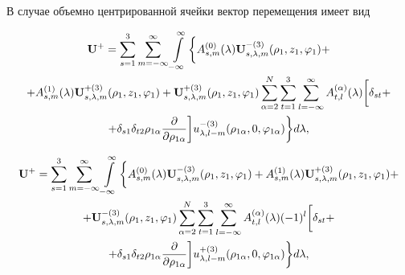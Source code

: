 В случае объемно центрированной ячейки вектор перемещения имеет вид

\begin{multline}
{{\bf{U}}^ + } = \sum\limits_{s = 1}^3 {\sum\limits_{m =  - \infty }^\infty  {\int\limits_{ - \infty }^\infty  \bigg\{  } } A_{s,m}^{(0)}(\lambda ){\bf{U}}_{s,\lambda ,m}^{ - (3)}({\rho _1},{z_1},{\varphi _1}) + \\
+ A_{s,m}^{(1)}(\lambda ){\bf{U}}_{s,\lambda ,m}^{ + (3)}({\rho _1},{z_1},{\varphi _1}) + {\bf{U}}_{s,\lambda ,m}^{ + (3)}({\rho _1},{z_1},{\varphi _1})\sum\limits_{\alpha  = 2}^N {\sum\limits_{t = 1}^3 {\sum\limits_{l =  - \infty }^\infty  {A_{t,l}^{(\alpha )}} } } (\lambda )\bigg[{\delta _{st}} + \\
+ {\delta _{s1}}{\delta _{t2}}{\rho _{1\alpha }}\frac{\partial }{{\partial {\rho _{1\alpha }}}}\bigg]u_{\lambda ,l - m}^{ - (3)}({\rho _{1\alpha }},0,{\varphi _{1\alpha }})\bigg\} d\lambda,
\label{eq:7:30}
\end{multline}

\begin{multline}
{{\bf{U}}^ + } = \sum\limits_{s = 1}^3 {\sum\limits_{m =  - \infty }^\infty  {\int\limits_{ - \infty }^\infty  \bigg\{  } } A_{s,m}^{(0)}(\lambda ){\bf{U}}_{s,\lambda ,m}^{ - (3)}({\rho _1},{z_1},{\varphi _1}) + A_{s,m}^{(1)}(\lambda ){\bf{U}}_{s,\lambda ,m}^{ + (3)}({\rho _1},{z_1},{\varphi _1}) + \\
+ {\bf{U}}_{s,\lambda ,m}^{ - (3)}({\rho _1},{z_1},{\varphi _1})\sum\limits_{\alpha  = 2}^N {\sum\limits_{t = 1}^3 {\sum\limits_{l =  - \infty }^\infty  {A_{t,l}^{(\alpha )}} } } (\lambda ){( - 1)^l}\bigg[{\delta _{st}} + \\
+ {\delta _{s1}}{\delta _{t2}}{\rho _{1\alpha }}\frac{\partial }{{\partial {\rho _{1\alpha }}}}\bigg]u_{\lambda ,l - m}^{ + (3)}({\rho _{1\alpha }},0,{\varphi _{1\alpha }})\bigg\} d\lambda,
\label{eq:7:31}
\end{multline}

